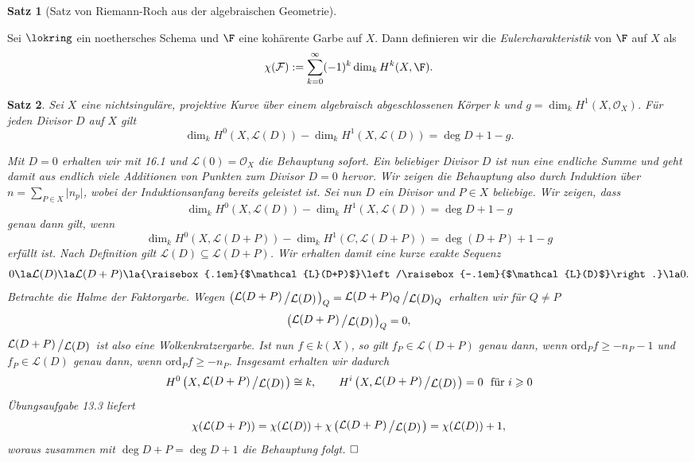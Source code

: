 \documentclass[11pt]{book}
\newtheorem{theorem}{Satz}[section]
\theoremstyle{nonumberbreak}
\newenvironment{defin}[1][]{\ifthenelse{\equal{#1}{}}{\definition}{\definition[#1]}\rm}{\enddefinition}
\newenvironment{pr}[1][]{\ifthenelse{\equal{#1}{}}{\proof}{\proof[#1]}\rm}{\endproof}
\newcommand{\slant}[2]{{\raisebox{.1em}{$#1$}\left/\raisebox{-.1em}{$#2$}\right.}}
\begin{document}
\begin{spacing}{1.4}
\begin{theorem}[Satz von Riemann-Roch aus der algebraischen Geometrie]
\end{theorem}


\begin{defin}
Sei $\lokring$ ein noethersches Schema und $\F$ eine kohärente Garbe auf $X$. Dann definieren wir die \textit{Eulercharakteristik} von $\F$ auf $X$ als
$$\chi(\mathcal{F}) := \sum_{k=0}^{\infty} (-1)^k \dim_k H^{k}(X, \F).$$

\end{defin}

\begin{theorem}
Sei $X$ eine nichtsinguläre, projektive Kurve über einem algebraisch abgeschlossenen Körper $k$ und $g= \dim_k H^{1}(X, \mathcal{O}_X)$. Für jeden Divisor $D$ auf $X$ gilt
$$\dim_k H^{0}(X, \mathcal{L}(D)) - \dim_k H^{1}(X, \mathcal{L}(D)) = \deg D +1 - g.$$

\begin{pr}
Mit $D=0$ erhalten wir mit 16.1 und $\mathcal{L}(0)= \mathcal{O}_X$ die Behauptung sofort. Ein beliebiger Divisor $D$ ist nun eine endliche Summe und geht damit aus endlich viele Additionen von Punkten zum Divisor $D=0$ hervor. Wir zeigen die Behauptung also durch Induktion über $n=\sum_{P \in X} \vert n_p \vert$, wobei der Induktionsanfang bereits geleistet ist. Sei nun $D$ ein Divisor und $P \in X$ beliebige. Wir zeigen, dass
$$\dim_k H^{0}(X, \mathcal{L}(D)) - \dim_k H^{1}(X, \mathcal{L}(D)) = \deg D +1 - g$$
genau dann gilt, wenn 
$$\dim_k H^{0}(X, \mathcal{L}(D+P)) - \dim_k H^{1}(C, \mathcal{L}(D+P)) = \deg( D+P) +1 - g$$
erfüllt ist. Nach Definition gilt $\mathcal{L}(D) \subseteq \mathcal{L}(D+P)$. Wir erhalten damit eine kurze exakte Sequenz 
$$0 \la \mathcal{L}(D) \la \mathcal{L}(D+P) \la \slant{\mathcal{L}(D+P)}{\mathcal{L}(D)} \la 0.$$
Betrachte die Halme der Faktorgarbe. Wegen $\left( \slant{\mathcal{L}(D+P)}{\mathcal{L}(D)}\right)_Q = \slant{\mathcal{L}(D+P)_Q}{\mathcal{L}(D)_Q}$ erhalten wir für $Q\neq P$
$$\left( \slant{\mathcal{L}(D+P)}{\mathcal{L}(D)}\right)_Q =0,$$
 $\slant{\mathcal{L}(D+P)}{\mathcal{L}(D)}$ ist also eine Wolkenkratzergarbe. Ist nun $f \in k(X)$, so gilt $f_P \in \mathcal{L}(D+P)$ genau dann, wenn $\mathrm{ord}_P f \geqslant -n_P -1$ und $f_P \in \mathcal{L}(D)$ genau dann, wenn $\mathrm{ord}_Pf \geqslant -n_P$. Insgesamt erhalten wir dadurch
 $$H^{0}\left(X, \slant{\mathcal{L}(D+P)}{\mathcal{L}(D)} \right) \cong k, \qquad H^{i}\left(X, \slant{\mathcal{L}(D+P)}{\mathcal{L}(D)} \right) =0 \ \ \textrm{für }i \geqslant 0$$
 Übungsaufgabe 13.3 liefert 
 $$\chi(\mathcal{L}(D+P)) = \chi(\mathcal{L}(D)) + \chi \left( \slant{\mathcal{L}(D+P)}{\mathcal{L}(D)}\right) = \chi(\mathcal{L}(D)) + 1,$$
 woraus zusammen mit $\deg D+P = \deg D + 1$ die Behauptung folgt. $\hfill \Box$



\end{pr}
\end{theorem}
\end{spacing}
\end{document}
